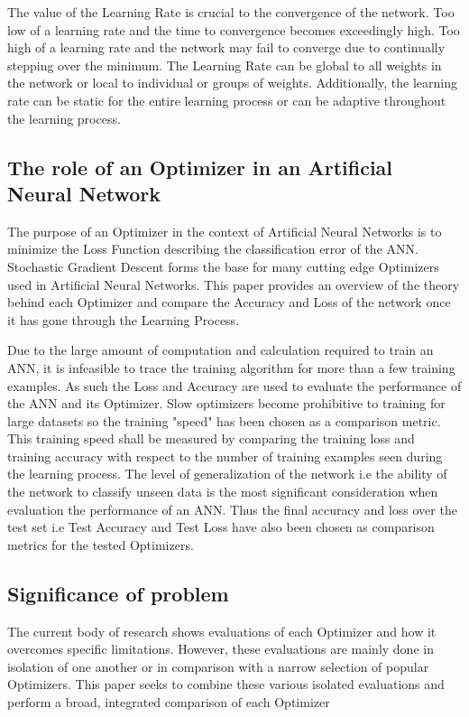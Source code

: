 \documentclass{article}
\begin{document}
The value of the Learning Rate is crucial to the convergence of the network. Too low of a learning rate and the time to convergence becomes exceedingly high. Too high of a learning rate and the network may fail to converge due to continually stepping over the minimum. The Learning Rate can be global to all weights in the network or local to individual or groups of weights. Additionally, the learning rate can be static for the entire learning process or can be adaptive throughout the learning process.


\subsection{The role of an Optimizer in an Artificial Neural Network}	The purpose of an Optimizer in the context of Artificial Neural Networks is to minimize the Loss Function describing the classification error of the ANN. 
	Stochastic Gradient Descent forms the base for many cutting edge Optimizers used in Artificial Neural Networks. This paper provides an overview of the theory behind each Optimizer and compare the Accuracy and Loss of the network once it has gone through the Learning Process.   


	Due to the large amount of computation and calculation required to train an ANN, it is infeasible to trace the training algorithm for more than a few training examples. As such the Loss and Accuracy are used to evaluate the performance of the ANN and its Optimizer. Slow optimizers become prohibitive to training for large datasets so the training "speed" has been chosen as a comparison metric. This training speed shall be measured by comparing the training loss and training accuracy with respect to the number of training examples seen during the learning process. The level of generalization of the network i.e the ability of the network to classify unseen data is the most significant consideration when evaluation the performance of an ANN. Thus the final accuracy and loss over the test set i.e Test Accuracy and Test Loss have also been chosen as comparison metrics for the tested Optimizers. 
	
	\subsection{Significance of problem}
	The current body of research shows evaluations of each Optimizer and how it overcomes specific limitations. However, these evaluations are mainly done in isolation of one another or in comparison with a narrow selection of popular Optimizers. This paper seeks to combine these various isolated evaluations and perform a broad, integrated comparison of each Optimizer
	
\end{document}
